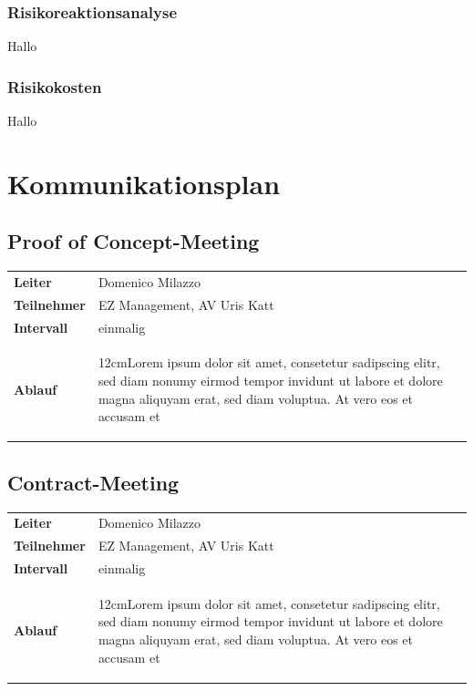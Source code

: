\documentclass[a4paper,10pt]{scrartcl}
\newcommand\Absatz[2][12cm]{\begin{varwidth}{#1}\flushleft#2\end{varwidth}}
\begin{document}
\subsubsection{Risikoreaktionsanalyse}
Hallo

\subsubsection{Risikokosten}
Hallo

\newpage

\section{Kommunikationsplan}
\subsection{Proof of Concept-Meeting}
\begin{tabular}{ll} 
\toprule
\textbf{Leiter} & Domenico Milazzo\\
\textbf{Teilnehmer}  & EZ Management, AV Uris Katt\\
\midrule 
\textbf{Intervall}  & einmalig\\
\midrule 
\textbf{Ablauf}  & {\Absatz{Lorem ipsum dolor sit amet, consetetur sadipscing elitr, sed diam nonumy eirmod tempor invidunt ut labore et dolore magna aliquyam erat, sed diam voluptua. At vero eos et accusam et \linebreak}}\\
\bottomrule
\end{tabular}
\vspace{5mm}

\subsection{Contract-Meeting}
\begin{tabular}{ll} 
\toprule
\textbf{Leiter} & Domenico Milazzo\\
\textbf{Teilnehmer}  & EZ Management, AV Uris Katt\\
\midrule 
\textbf{Intervall}  & einmalig\\
\midrule 
\textbf{Ablauf}  & {\Absatz{Lorem ipsum dolor sit amet, consetetur sadipscing elitr, sed diam nonumy eirmod tempor invidunt ut labore et dolore magna aliquyam erat, sed diam voluptua. At vero eos et accusam et \linebreak}}\\
\bottomrule
\end{tabular}
\vspace{5mm}
\end{document}

